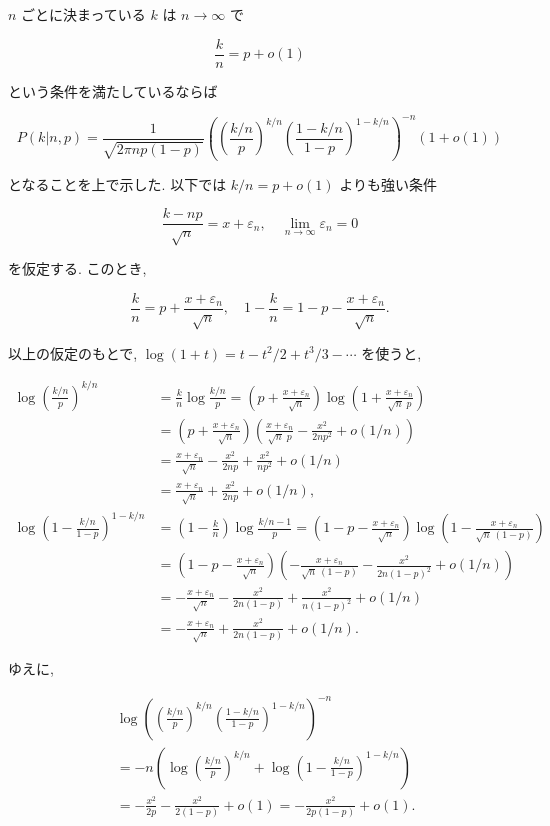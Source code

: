 \documentclass[10pt, a4paper,xelatex,ja=standard]{bxjsarticle}
\newcommand\eps{\varepsilon}
\begin{document}
\(n\) ごとに決まっている \(k\) は \(n\to\infty\) で

\[
\frac{k}{n} = p + o(1)
\]

という条件を満たしているならば

\[
P(k|n,p) =
\frac{1}{\sqrt{2\pi np(1-p)}}
\left(\left(\frac{k/n}{p}\right)^{k/n}\left(\frac{1-k/n}{1-p}\right)^{1-k/n}\right)^{-n}
(1 + o(1))
\]

となることを上で示した. 以下では \(k/n = p + o(1)\) よりも強い条件

\[
\frac{k - np}{\sqrt{n}} = x + \eps_n, \quad
\lim_{n\to\infty}\eps_n = 0
\]

を仮定する. このとき,

\[
\frac{k}{n} = p + \frac{x+\eps_n}{\sqrt{n}}, \quad
1-\frac{k}{n} = 1 - p - \frac{x+\eps_n}{\sqrt{n}}.
\]

以上の仮定のもとで, \(\log(1+t)=t-t^2/2+t^3/3-\cdots\) を使うと,

\[
\begin{aligned}
\log\left(\frac{k/n}{p}\right)^{k/n} &=
\frac{k}{n}\log\frac{k/n}{p} =
\left(p + \frac{x+\eps_n}{\sqrt{n}}\right)
\log\left(1 + \frac{x+\eps_n}{\sqrt{n}\;p}\right)
\\ &=
\left(p + \frac{x+\eps_n}{\sqrt{n}}\right)
\left(\frac{x+\eps_n}{\sqrt{n}\;p} - \frac{x^2}{2np^2} + o(1/n)\right)
\\ &=
\frac{x+\eps_n}{\sqrt{n}} - \frac{x^2}{2np} + \frac{x^2}{np^2} + o(1/n)
\\ &=
\frac{x+\eps_n}{\sqrt{n}} + \frac{x^2}{2np} + o(1/n),
\\
\log\left(1-\frac{k/n}{1-p}\right)^{1-k/n} &=
\left(1-\frac{k}{n}\right)\log\frac{k/n-1}{p} =
\left(1 - p - \frac{x+\eps_n}{\sqrt{n}}\right)
\log\left(1 - \frac{x+\eps_n}{\sqrt{n}\,(1-p)}\right)
\\ &=
\left(1 - p - \frac{x+\eps_n}{\sqrt{n}}\right)
\left(-\frac{x+\eps_n}{\sqrt{n}\,(1-p)} - \frac{x^2}{2n(1-p)^2} + o(1/n)\right)
\\ &= -
\frac{x+\eps_n}{\sqrt{n}} - \frac{x^2}{2n(1-p)} + \frac{x^2}{n(1-p)^2} + o(1/n)
\\ &= -
\frac{x+\eps_n}{\sqrt{n}} + \frac{x^2}{2n(1-p)} + o(1/n).
\end{aligned}
\]

ゆえに,

\[
\begin{aligned}
&
\log\left(\left(\frac{k/n}{p}\right)^{k/n}\left(\frac{1-k/n}{1-p}\right)^{1-k/n}\right)^{-n}
\\ &=
-n\left(
\log\left(\frac{k/n}{p}\right)^{k/n} +
\log\left(1-\frac{k/n}{1-p}\right)^{1-k/n}
\right)
\\ &= -
\frac{x^2}{2p} - \frac{x^2}{2(1-p)} + o(1) = -
\frac{x^2}{2p(1-p)} + o(1).
\end{aligned}
\]
\end{document}
